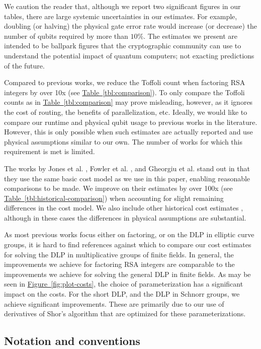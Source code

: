 \documentclass[superscriptaddress,notitlepage,longbibliography]{revtex4-1}
\theoremstyle{definition}
\theoremstyle{definition}
\newcommand{\fig}[1]{\hyperref[fig:#1]{Figure~\ref*{fig:#1}}}
\newcommand{\tbl}[1]{\hyperref[tbl:#1]{Table~\ref*{tbl:#1}}}
\begin{document}
We caution the reader that, although we report two significant figures in our tables, there are large systemic uncertainties in our estimates.
For example, doubling (or halving) the physical gate error rate would increase (or decrease) the number of qubits required by more than $10\%$.
The estimates we present are intended to be ballpark figures that the cryptographic community can use to understand the potential impact of quantum computers; not exacting predictions of the future.

Compared to previous works, we reduce the Toffoli count when factoring RSA integers by over 10x (see \tbl{comparison}).
To only compare the Toffoli counts as in \tbl{comparison} may prove misleading, however, as it ignores the cost of routing, the benefits of parallelization, etc.
Ideally, we would like to compare our runtime and physical qubit usage to previous works in the literature.
However, this is only possible when such estimates are actually reported and use physical assumptions similar to our own.
The number of works for which this requirement is met is limited.

The works by Jones et al. \cite{jones2012layered}, Fowler et al. \cite{fowler2012surfacecodereview}, and Gheorgiu et al. \cite{gheorghiu2019cryptanalysis} stand out in that they use the same basic cost model as we use in this paper, enabling reasonable comparisons to be made.
We improve on their estimates by over 100x (see \tbl{historical-comparison}) when accounting for slight remaining differences in the cost model.
We also include other historical cost estimates \cite{van2010distributed,ogorman2017factories}, although in these cases the differences in physical assumptions are substantial.

As most previous works focus either on factoring, or on the DLP in elliptic curve groups, it is hard to find references against which to compare our cost estimates for solving the DLP in multiplicative groups of finite fields.
In general, the improvements we achieve for factoring RSA integers are comparable to the improvements we achieve for solving the general DLP in finite fields.
As may be seen in \fig{plot-costs}, the choice of parameterization has a significant impact on the costs.
For the short DLP, and the DLP in Schnorr groups, we achieve significant improvements.
These are primarily due to our use of derivatives of Shor's algorithm that are optimized for these parameterizations.

\subsection{Notation and conventions}
\end{document}
